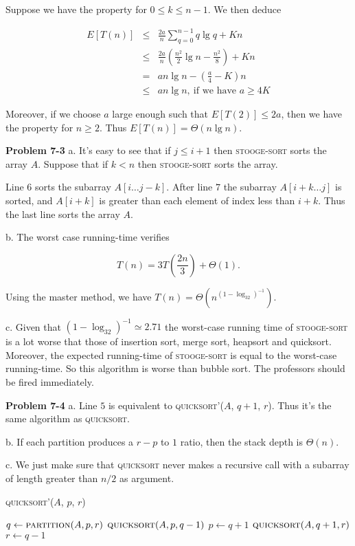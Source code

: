 \documentclass[a4paper,12pt]{article}
\newcommand{\newprob}[1]
{\bigskip \noindent \textbf{Problem #1} \newline}
\newcommand{\subpar}[1]{\medskip \noindent #1.}
\newcommand{\la}{\leftarrow}
\begin{document}
Suppose we have the property for $0 \le k \le n-1$.  We then deduce

\begin{eqnarray*}
  E[T(n)] &\le& \frac{2a}{n} \sum_{q=0}^{n-1} q \lg q + Kn \\
  &\le& \frac{2a}{n} \left(\frac{n^2}{2}\lg n - \frac{n^2}{8}\right)
  + Kn \\
  &=& a n \lg n - \left(\frac{a}{4} -K\right)n \\
  &\le& a n \lg n,\ \mbox{if we have $a \ge 4K$}
\end{eqnarray*}

Moreover, if we choose $a$ large enough such that $E[T(2)] \le 2a$,
then we have the property for $n \ge 2$.  Thus $E[T(n)] = \Theta(n\lg
n)$.

\newprob{7-3}
\subpar{a}
It's easy to see that if $j \le i+1$ then \textsc{stooge-sort} sorts
the array $A$.  Suppose that if $k < n$ then \textsc{stooge-sort}
sorts the array.

Line $6$ sorts the subarray $A[i\ldots j-k]$.  After line $7$ the
subarray $A[i+k\ldots j]$ is sorted, and $A[i+k]$ is greater than each
element of index less than $i+k$.  Thus the last line sorts the array
$A$.

\subpar{b}  The worst case running-time verifies

\[ T(n) = 3 T\left(\frac{2n}{3}\right) + \Theta(1).\]

Using the master method, we have $T(n) = \Theta(n^{(1 - \log_32)^{-1}})$.

\subpar{c} Given that $(1- \log_32)^{-1} \simeq 2.71$ the worst-case
running time of \textsc{stooge-sort} is a lot worse that those of
insertion sort, merge sort, heapsort and quicksort.  Moreover, the
expected running-time of \textsc{stooge-sort} is equal to the
worst-case running-time.  So this algorithm is worse than bubble
sort.  The professors should be fired immediately.

\newprob{7-4}
\subpar{a} Line $5$ is equivalent to \textsc{quicksort'}($A$,
$q+1$, $r$).  Thus it's the same algorithm as \textsc{quicksort}.

\subpar{b} If each partition produces a $r-p$ to $1$ ratio, then the
stack depth is $\Theta(n)$.

\subpar{c} We just make sure that \textsc{quicksort} never makes a
recursive call with a subarray of length greater than $n/2$ as
argument.

\newpage
\noindent
\textsc{quicksort'}($A$, $p$, $r$)
\begin{algorithmic}
  \STATE $q \la \textsc{partition}(A, p, r)$
  \STATE $\textsc{quicksort}(A, p, q-1)$
  \STATE $p \la q+1$
  \ELSE
  \STATE $\textsc{quicksort}(A, q+1, r)$
  \STATE $r \la q-1$
  \ENDIF
  \ENDWHILE
\end{algorithmic}
\end{document}
